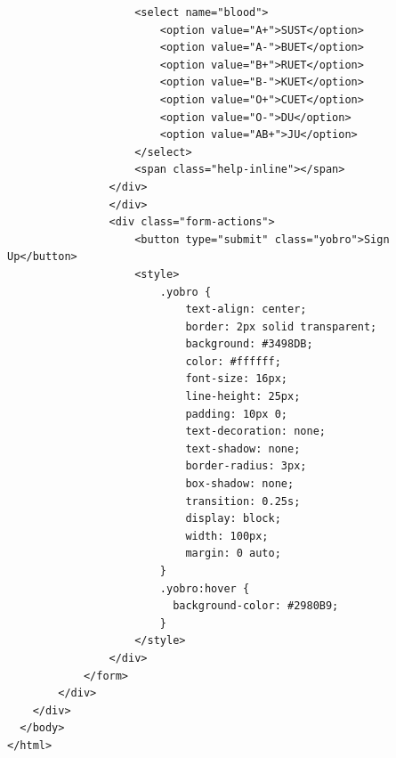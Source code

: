 \documentclass{scrreprt}
\begin{document}
\begin{verbatim}
                    <select name="blood">
                        <option value="A+">SUST</option>
                        <option value="A-">BUET</option>
                        <option value="B+">RUET</option>
                        <option value="B-">KUET</option>
                        <option value="O+">CUET</option>
                        <option value="O-">DU</option>
                        <option value="AB+">JU</option>
                    </select>
                    <span class="help-inline"></span>
                </div>
                </div>
                <div class="form-actions">
                    <button type="submit" class="yobro">Sign Up</button>
                    <style>
                        .yobro {
                            text-align: center;
                            border: 2px solid transparent;
                            background: #3498DB;
                            color: #ffffff;
                            font-size: 16px;
                            line-height: 25px;
                            padding: 10px 0;
                            text-decoration: none;
                            text-shadow: none;
                            border-radius: 3px;
                            box-shadow: none;
                            transition: 0.25s;
                            display: block;
                            width: 100px;
                            margin: 0 auto;
                        }
                        .yobro:hover {
                          background-color: #2980B9;
                        }
                    </style>
                </div>
            </form>
        </div>  
    </div>
  </body>
</html>
\end{verbatim}
\end{document}
